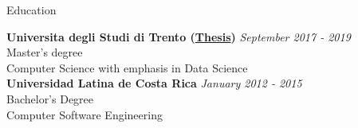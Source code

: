 \documentclass{resume} %
\begin{document}

\begin{rSection}{Education}

{\bf Universita degli Studi di Trento (\href{https://github.com/tupini07/Master-Thesis/tree/master}{Thesis})} \hfill {\em September 2017 - 2019} 
\\ Master's degree \hfill 
\\ Computer Science with emphasis in Data Science \\


{\bf Universidad Latina de Costa Rica} \hfill {\em January 2012 - 2015} 
\\ Bachelor’s Degree \hfill 
\\ Computer Software Engineering 


\end{rSection}
\end{document}
